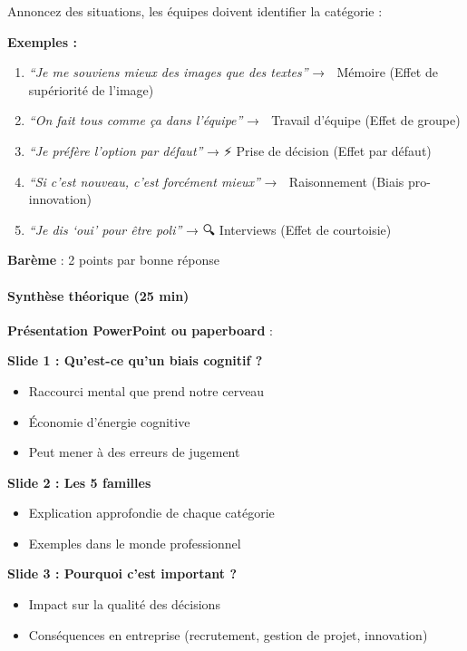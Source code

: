 \documentclass[
]{article}
\providecommand{\tightlist}{%
  \setlength{\itemsep}{0pt}\setlength{\parskip}{0pt}}
\begin{document}
Annoncez des situations, les équipes doivent identifier la catégorie :

\textbf{Exemples :}

\begin{enumerate}
\def\labelenumi{\arabic{enumi}.}
\tightlist
\item
  \emph{``Je me souviens mieux des images que des textes''} → 🧠 Mémoire
  (Effet de supériorité de l'image)
\item
  \emph{``On fait tous comme ça dans l'équipe''} → 👥 Travail d'équipe
  (Effet de groupe)
\item
  \emph{``Je préfère l'option par défaut''} → ⚡ Prise de décision
  (Effet par défaut)
\item
  \emph{``Si c'est nouveau, c'est forcément mieux''} → 🤔 Raisonnement
  (Biais pro-innovation)
\item
  \emph{``Je dis `oui' pour être poli''} → 🔍 Interviews (Effet de
  courtoisie)
\end{enumerate}

\textbf{Barème} : 2 points par bonne réponse

\paragraph{Synthèse théorique (25
min)}\label{synthuxe8se-thuxe9orique-25-min}

\textbf{Présentation PowerPoint ou paperboard} :

\textbf{Slide 1 : Qu'est-ce qu'un biais cognitif ?}

\begin{itemize}
\tightlist
\item
  Raccourci mental que prend notre cerveau
\item
  Économie d'énergie cognitive
\item
  Peut mener à des erreurs de jugement
\end{itemize}

\textbf{Slide 2 : Les 5 familles}

\begin{itemize}
\tightlist
\item
  Explication approfondie de chaque catégorie
\item
  Exemples dans le monde professionnel
\end{itemize}

\textbf{Slide 3 : Pourquoi c'est important ?}

\begin{itemize}
\tightlist
\item
  Impact sur la qualité des décisions
\item
  Conséquences en entreprise (recrutement, gestion de projet,
  innovation)
\end{itemize}
\end{document}

